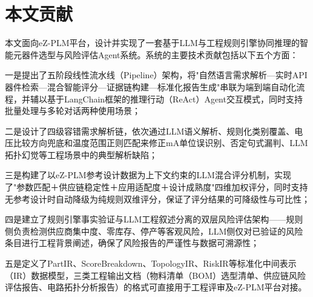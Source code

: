 \section{本文贡献}

本文面向eZ-PLM平台，设计并实现了一套基于LLM与工程规则引擎协同推理的智能元器件选型与风险评估Agent系统。系统的主要技术贡献包括以下五个方面：

一是提出了五阶段线性流水线（Pipeline）架构，将"自然语言需求解析—实时API器件检索—混合智能评分—证据链构建—标准化报告生成"串联为端到端自动化流程，并辅以基于LangChain框架的推理行动（ReAct）Agent交互模式\cite{yao2022react}，同时支持批量处理与多轮对话两种使用场景；

二是设计了四级容错需求解析链，依次通过LLM语义解析、规则化类别覆盖、电压比较方向兜底和温度范围正则匹配来修正mA单位误识别、否定句式漏判、LLM拓扑幻觉等工程场景中的典型解析缺陷；

三是构建了以eZ-PLM参考设计数据为上下文约束的LLM混合评分机制，实现了"参数匹配＋供应链稳定性＋应用适配度＋设计成熟度"四维加权评分，同时支持无参考设计时自动降级为纯规则双维评分，保证了评分结果的可降级性与可比性；

四是建立了规则引擎事实验证与LLM工程叙述分离的双层风险评估架构——规则侧负责检测供应商集中度、零库存、停产等客观风险，LLM侧仅对已验证的风险条目进行工程背景阐述，确保了风险报告的严谨性与数据可溯源性；

五是定义了PartIR、ScoreBreakdown、TopologyIR、RiskIR等标准化中间表示（IR）数据模型，三类工程输出文档（物料清单（BOM）选型清单、供应链风险评估报告、电路拓扑分析报告）的格式可直接用于工程评审及eZ-PLM平台对接。
